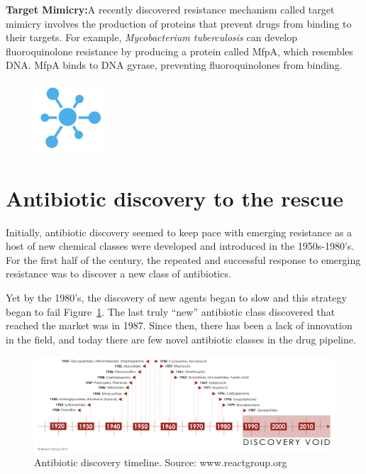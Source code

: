 \documentclass[
  letterpaper,
  DIV=11,
  numbers=noendperiod]{scrreprt}
\begin{document}
\textbf{Target Mimicry:}A recently discovered resistance mechanism
called target mimicry involves the production of proteins that prevent
drugs from binding to their targets. For example, \emph{Mycobacterium
tuberculosis} can develop fluoroquinolone resistance by producing a
protein called MfpA, which resembles DNA. MfpA binds to DNA gyrase,
preventing fluoroquinolones from binding.

\begin{figure}

{\centering \includegraphics[width=1.04167in,height=\textheight]{images/breakblue.png}

}

\end{figure}

\hypertarget{antibiotic-discovery-to-the-rescue}{%
\section{Antibiotic discovery to the
rescue}\label{antibiotic-discovery-to-the-rescue}}

Initially, antibiotic discovery seemed to keep pace with emerging
resistance as a host of new chemical classes were developed and
introduced in the 1950s-1980's. For the first half of the century, the
repeated and successful response to emerging resistance was to discover
a new class of antibiotics.

Yet by the 1980's, the discovery of new agents began to slow and this
strategy began to fail Figure~\ref{fig-abxtimeline}. The last truly
``new'' antibiotic class discovered that reached the market was in 1987.
Since then, there has been a lack of innovation in the field, and today
there are few novel antibiotic classes in the drug pipeline.

\begin{figure}

{\centering 

\includegraphics{images/ab-discovery-timeline.png}

}

\caption{\label{fig-abxtimeline}Antibiotic discovery timeline. Source:
www.reactgroup.org}

\end{figure}
\end{document}
